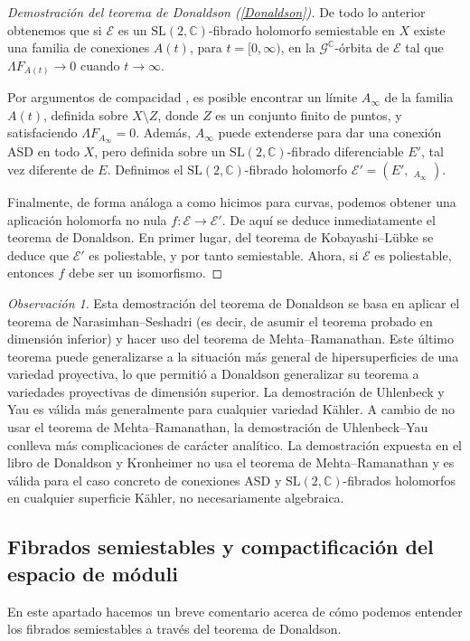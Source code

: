 \documentclass[12pt, a4paper]{amsart}
\newcommand\CC{\mathbb{C}}
\newcommand\SL{\mathrm{SL}}
\newcommand\GG{\mathcal{G}}
\newcommand\EE{\mathscr{E}}
\DeclareMathOperator\delbar{\bar{\partial}}
\theoremstyle{remark} \newtheorem{rmk}[thm]{Observación}
\theoremstyle{remark} \newtheorem{rmks}[thm]{Observaciones}
\theoremstyle{definition} \newtheorem{defn}[thm]{Definición}
\theoremstyle{definition} \newtheorem{ejs}[thm]{Ejemplos}
\theoremstyle{definition} \newtheorem{ej}[thm]{Ejemplo}
\begin{document}
\begin{proof}[Demostración del teorema de Donaldson (\ref{Donaldson})]
De todo lo anterior obtenemos que si $\EE$ es un $\SL(2,\CC)$-fibrado  holomorfo semiestable en $X$ existe una familia de conexiones $A(t)$, para $t=[0,\infty)$, en la $\GG^\CC$-órbita de  $\EE$ tal que  $\Lambda F_{A(t)}\rightarrow 0$ cuando $t\rightarrow \infty$.

	Por argumentos de compacidad \cite[\S 4.4]{DK}, es posible encontrar un límite $A_\infty$ de la familia  $A(t)$, definida sobre $X\setminus Z$, donde $Z$ es un conjunto finito de puntos, y satisfaciendo $\Lambda F_{A_\infty}=0$. Además, $A_\infty$ puede extenderse para dar una conexión ASD en todo  $X$, pero definida sobre un $\SL(2,\CC)$-fibrado diferenciable $E'$, tal vez diferente de $E$. Definimos el $\SL(2,\CC)$-fibrado holomorfo  $\EE'=(E',\delbar_{A_\infty})$.

	Finalmente, de forma análoga a como hicimos para curvas, podemos obtener una aplicación holomorfa no nula $f:\EE \rightarrow \EE'$.
De aquí se deduce inmediatamente el teorema de Donaldson. En primer lugar, del teorema de Kobayashi--Lübke se deduce que $\EE'$ es poliestable, y por tanto semiestable. Ahora, si $\EE$ es poliestable, entonces $f$ debe ser un isomorfismo.
\end{proof}

\begin{rmk}
	Esta demostración del teorema de Donaldson se basa en aplicar el teorema de Narasimhan--Seshadri (es decir, de asumir el teorema probado en dimensión inferior) y hacer uso del teorema de Mehta--Ramanathan. Este último teorema puede generalizarse a la situación más general de hipersuperficies de una variedad proyectiva, lo que permitió a Donaldson generalizar su teorema a variedades proyectivas de dimensión superior. La demostración de Uhlenbeck y Yau es válida más generalmente para cualquier variedad Kähler. A cambio de no usar el teorema de Mehta--Ramanathan, la demostración de Uhlenbeck--Yau \cite{UY} conlleva más complicaciones de carácter analítico. La demostración expuesta en el libro de Donaldson y Kronheimer \cite[Capítulo 6]{DK} no usa el teorema de Mehta--Ramanathan y es válida para el caso concreto de conexiones ASD y $\SL(2,\CC)$-fibrados holomorfos en cualquier superficie Kähler, no necesariamente algebraica.
\end{rmk}

\subsection{Fibrados semiestables y compactificación del espacio de móduli}
En este apartado hacemos un breve comentario acerca de cómo podemos entender los fibrados semiestables a través del teorema de Donaldson. 
\end{document}
